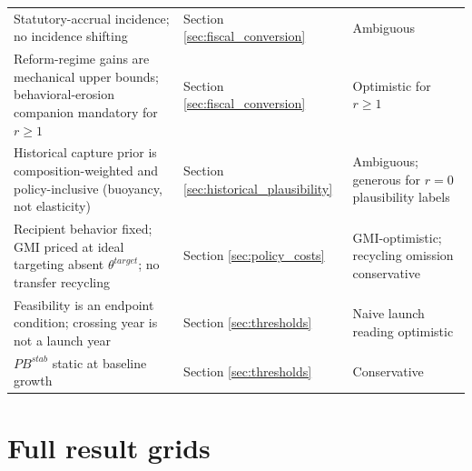 \documentclass[11pt,a4paper]{article}
\begin{document}
\begin{longtable}{p{}p{}p{}}
Statutory-accrual incidence; no incidence shifting & Section \ref{sec:fiscal_conversion} & Ambiguous \\
Reform-regime gains are mechanical upper bounds; behavioral-erosion companion mandatory for \(r\geq1\) & Section \ref{sec:fiscal_conversion} & Optimistic for \(r\geq1\) \\
Historical capture prior is composition-weighted and policy-inclusive (buoyancy, not elasticity) & Section \ref{sec:historical_plausibility} & Ambiguous; generous for $r=0$ plausibility labels \\
Recipient behavior fixed; GMI priced at ideal targeting absent \(\theta^{target}\); no transfer recycling & Section \ref{sec:policy_costs} & GMI-optimistic; recycling omission conservative \\
Feasibility is an endpoint condition; crossing year is not a launch year & Section \ref{sec:thresholds} & Naive launch reading optimistic \\
\(PB^{stab}\) static at baseline growth & Section \ref{sec:thresholds} & Conservative \\
\bottomrule
\end{longtable}


\section{Full result grids}

\begingroup
\def\gridcaption{Full grid backing compact Table 4 of the main text}
\makeatletter
\let\gridoriginalLTmakecaption\LT@makecaption
\renewcommand{\LT@makecaption}[3]{\gridoriginalLTmakecaption{#1}{#2}{\gridcaption}}
\makeatother
\renewcommand{\label}[1]{}

\endgroup

\begingroup
\def\gridcaption{Full grid backing compact Table 5 of the main text}
\makeatletter
\let\gridoriginalLTmakecaption\LT@makecaption
\renewcommand{\LT@makecaption}[3]{\gridoriginalLTmakecaption{#1}{#2}{\gridcaption}}
\makeatother
\renewcommand{\label}[1]{}

\endgroup

\begingroup
\def\gridcaption{Full grid backing compact Table 6 of the main text}
\makeatletter
\let\gridoriginalLTmakecaption\LT@makecaption
\renewcommand{\LT@makecaption}[3]{\gridoriginalLTmakecaption{#1}{#2}{\gridcaption}}
\makeatother
\renewcommand{\label}[1]{}

\endgroup

\begingroup
\def\gridcaption{Full grid backing compact Table 7 of the main text}
\makeatletter
\let\gridoriginalLTmakecaption\LT@makecaption
\renewcommand{\LT@makecaption}[3]{\gridoriginalLTmakecaption{#1}{#2}{\gridcaption}}
\makeatother
\renewcommand{\label}[1]{}

\endgroup
\end{document}
